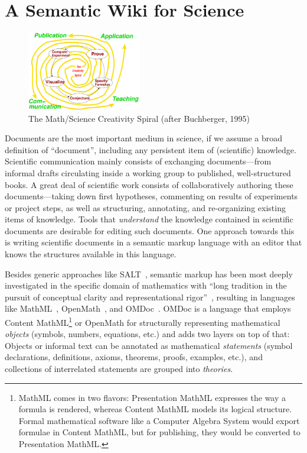 \section{A Semantic Wiki for Science}

\begin{figure}
  \centering
  \vspace{-.5cm}
  \includegraphics[width=5cm]{creativity-spiral}
  \vspace{-.5cm}
  \caption{The Math/Science Creativity Spiral (after Buchberger, 1995)}
  \label{fig:creativity-spiral}
\end{figure}

Documents are the most important medium in science, if we assume a broad definition of
``document'', including any persistent item of (scientific) knowledge.  Scientific
communication mainly consists of exchanging documents---from informal drafts circulating
inside a working group to published, well-structured books.  A great deal of scientific
work consists of collaboratively authoring these documents---taking down first hypotheses,
commenting on results of experiments or project steps, as well as structuring, annotating,
and re-organizing existing items of knowledge.  Tools that
\emph{understand} the knowledge contained in scientific documents are desirable for
editing such documents.  One approach towards this is writing scientific documents in a
semantic markup language with an editor that knows the structures available in this
language.

Besides generic approaches like SALT~\cite{Groza:SALT07}, semantic markup has been most
deeply investigated in the specific domain of mathematics with ``long tradition in the
pursuit of conceptual clarity and representational rigor''~\cite{Kohlhase:omdoc1.2},
resulting in languages like MathML~\cite{CarlisleEd:MathML07},
OpenMath~\cite{BusCapCar:2oms04}, and OMDoc~\cite{Kohlhase:omdoc1.2}.  OMDoc is a language
that employs Content MathML\footnote{MathML comes in two flavors: Presentation MathML
  expresses the way a formula is rendered, whereas Content MathML models its logical
  structure.  Formal mathematical software like a Computer Algebra System would export
  formulae in Content MathML, but for publishing, they would be converted to Presentation
  MathML.} or OpenMath for structurally representing mathematical \emph{objects} (symbols,
numbers, equations, etc.) and adds two layers on top of that: Objects or informal text can
be annotated as mathematical \emph{statements} (symbol declarations, definitions, axioms,
theorems, proofs, examples, etc.), and collections of interrelated statements are grouped
into \emph{theories}.

